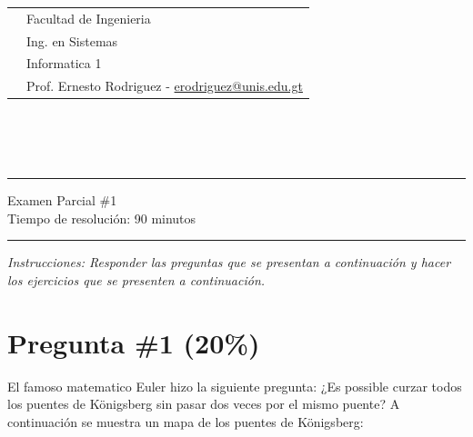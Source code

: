 \documentclass{article}
\newcommand{\horrule}[1]{\rule{\linewidth}{#1}}
\begin{document}
\begin{tabular}{l l}
 & Facultad de Ingenieria \\
 & Ing. en Sistemas \\
 & Informatica 1 \\
 & Prof. Ernesto Rodriguez - \href{mailto:erodriguez@unis.edu.gt}{erodriguez@unis.edu.gt} \\
\end{tabular}
\\\\\\

\begin{center}
        \horrule{0.5pt}
        \huge{Examen Parcial \#1} \\
        \large{Tiempo de resoluci\'on: 90 minutos} \\
        \horrule{1pt}
\end{center}

\emph{Instrucciones: Responder las preguntas que se presentan a continuaci\'on y hacer los ejercicios que se presenten
        a continuaci\'on.}


\section{Pregunta \#1 (20\%)}
El famoso matematico Euler hizo la siguiente pregunta: ¿Es possible curzar todos los puentes
de K\"onigsberg sin pasar dos veces por el mismo puente? A continuaci\'on se muestra un
mapa de los puentes de K\"onigsberg:
\end{document}
